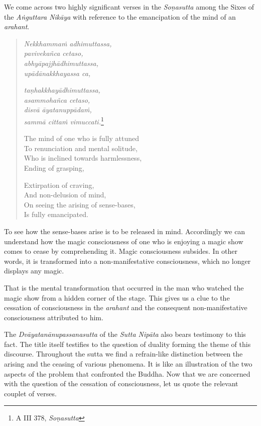 We come across two highly significant verses in the \emph{Soṇasutta} among the Sixes of the \emph{Aṅguttara Nikāya} with reference to the emancipation of the mind of an \emph{arahant}.

\begin{quote}
\emph{Nekkhammaṁ adhimuttassa,}\\
\emph{pavivekañca cetaso,}\\
\emph{abhyāpajjhādhimuttassa,}\\
\emph{upādānakkhayassa ca,}

\emph{taṇhakkhayādhimuttassa,}\\
\emph{asammohañca cetaso,}\\
\emph{disvā āyatanuppādaṁ,}\\
\emph{sammā cittaṁ vimuccati.}\footnote{A III 378, \emph{Soṇasutta}}

\clearpage

The mind of one who is fully attuned\\
To renunciation and mental solitude,\\
Who is inclined towards harmlessness,\\
Ending of grasping,

Extirpation of craving,\\
And non-delusion of mind,\\
On seeing the arising of sense-bases,\\
Is fully emancipated.
\end{quote}

To see how the sense-bases arise is to be released in mind. Accordingly we can understand how the magic consciousness of one who is enjoying a magic show comes to cease by comprehending it. Magic consciousness subsides. In other words, it is transformed into a non-manifestative consciousness, which no longer displays any magic.

That is the mental transformation that occurred in the man who watched the magic show from a hidden corner of the stage. This gives us a clue to the cessation of consciousness in the \emph{arahant} and the consequent non-manifestative consciousness attributed to him.

The \emph{Dvāyatanānupassanasutta} of the \emph{Sutta Nipāta} also bears testimony to this fact. The title itself testifies to the question of duality forming the theme of this discourse. Throughout the sutta we find a refrain-like distinction between the arising and the ceasing of various phenomena. It is like an illustration of the two aspects of the problem that confronted the Buddha. Now that we are concerned with the question of the cessation of consciousness, let us quote the relevant couplet of verses.

